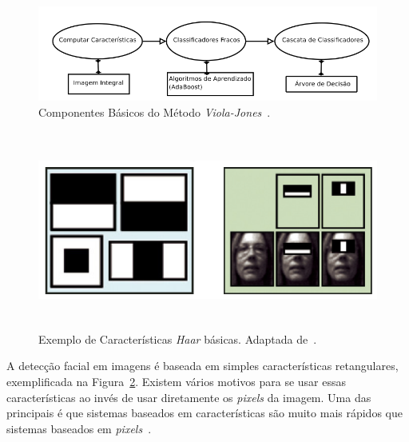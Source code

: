 	\begin{figure}[H]
		\begin{center}
			\includegraphics[scale=0.5]{figuras/2.FundamentacaoTeorica/edsonma.png}
		\end{center}
		\caption{Componentes Básicos do Método \textit{Viola-Jones}~\cite{edsonma}.}
		\label{fig:edsonma}
	\end{figure}

	\begin{figure}[H]
		\begin{center}
			\includegraphics[height=6.5cm,width=12.5cm]{figuras/2.FundamentacaoTeorica/haar_features.png}
		\end{center}
		\caption{Exemplo de Características \textit{Haar} básicas. Adaptada de~\cite{servodetection}.}
		\label{haarfeatures}
	\end{figure}

A detecção facial em imagens é baseada em simples características retangulares, exemplificada na Figura~\ref{haarfeatures}. Existem vários motivos para se usar essas características ao invés de usar diretamente os \textit{pixels} da imagem. Uma das principais é que sistemas baseados em características são muito mais rápidos que sistemas baseados em \textit{pixels}~\cite{violajones}. 


